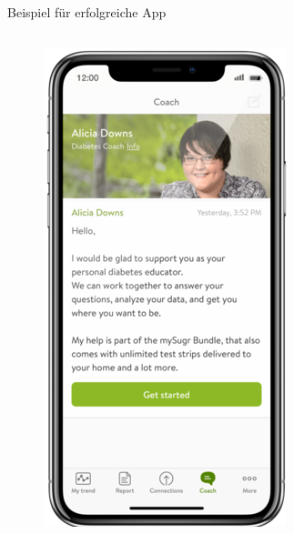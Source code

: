 \begin{frame}{Beispiel für erfolgreiche App}
\begin{columns}
\begin{column}{0.6\textwidth}
\begin{figure}
\begin{minipage}{0.33\textwidth}
                    \includegraphics[width=\textwidth]{Bilder/mysugr1.png}
                \end{minipage}%
                \begin{minipage}{0.33\textwidth}

\end{minipage}
\end{figure}
\end{column}
\end{columns}
\end{frame}
